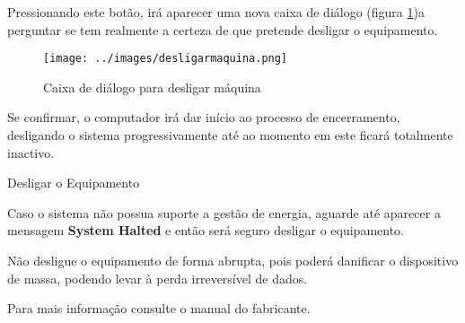 \documentclass[a4paper,11pt,openany]{memoir}
\newcommand\perigo{\texttt{[image: ../small-n-flat-master/png/96/shield-warning.png]}}
\newcommand{\bcperigo}[2]{\vspace{5mm}\begin{bclogo}[couleur=red!30,logo=\perigo]{\hspace{0.7cm}#1}{#2}\end{bclogo}}
\begin{document}
Pressionando este botão, irá aparecer uma nova caixa de diálogo (figura \ref{desligarmaquina})a perguntar se tem realmente a certeza
de que pretende desligar o equipamento.


\begin{figure}[h]
\begin{center}
\texttt{[image: ../images/desligarmaquina.png]}
\caption[Submanifold]{Caixa de diálogo para desligar máquina}
\label{desligarmaquina}
\end{center}
\end{figure}




Se confirmar, o computador irá dar início ao processo de encerramento, desligando o sistema progressivamente
até ao momento em este ficará totalmente inactivo.

\bcperigo{Desligar o Equipamento}{
        Caso o sistema não possua suporte a gestão de energia,
	aguarde até aparecer a mensagem \textbf{System Halted} e então será seguro desligar o equipamento.
	
	Não desligue o equipamento de forma abrupta, pois poderá danificar o dispositivo de massa, 
	podendo levar à perda irreversível de dados.
}






Para mais informação consulte o manual do fabricante.





% 


% 







% 
\end{document}
